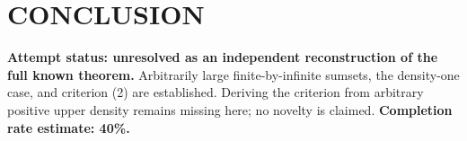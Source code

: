 \section{CONCLUSION}
\textbf{Attempt status: unresolved as an independent reconstruction of the full known theorem.} Arbitrarily large finite-by-infinite sumsets, the density-one case, and criterion (2) are established. Deriving the criterion from arbitrary positive upper density remains missing here; no novelty is claimed.
\textbf{Completion rate estimate: 40\%.}
